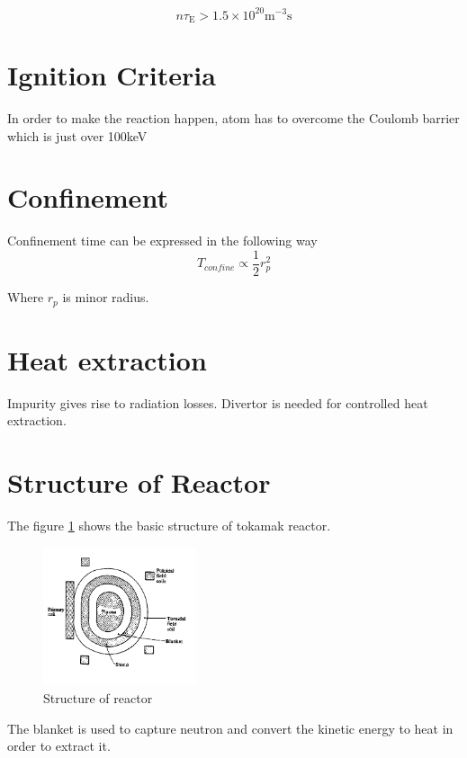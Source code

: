 \begin{equation}
n \tau_{\mathrm{E}}>1.5 \times 10^{20} \mathrm{m}^{-3} \mathrm{s}
\end{equation}


\section{Ignition Criteria}

In order to make the reaction happen, atom has to overcome the Coulomb barrier which is just over 100keV 


\section{Confinement}

Confinement time can be expressed in the following way
\begin{equation}
    T_{confine} \propto \frac{1}{2} r^2_p
\end{equation}

Where $r_p$ is minor radius. 

\section{Heat extraction}

Impurity gives rise to radiation losses. Divertor is needed for controlled heat extraction. 

\section{Structure of Reactor}

The figure \ref{fig:reactor} shows the basic structure of tokamak reactor. 

\begin{figure}[h] \centering
        \includegraphics[width=0.4\textwidth]{Image/reactor.png}
        \caption{Structure of reactor}
        \label{fig:reactor}
\end{figure}

The blanket is used to capture neutron and convert the kinetic energy to heat in order to extract it. 